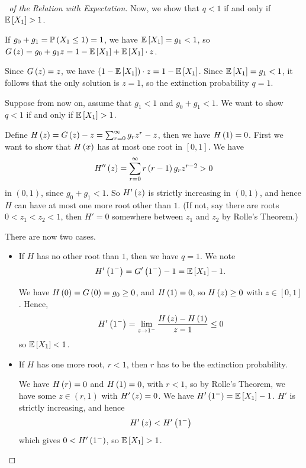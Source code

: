 \documentclass{article}
\theoremstyle{definition}
\theoremstyle{remark}
\newcommand{\Prob}{\mathbb{P}}
\newcommand{\Expt}{\mathbb{E}}
\newcommand{\ccintv}[2]{[#1,#2]}
\newcommand{\oointv}[2]{(#1,#2)}
\begin{document}
\begin{proof}[\proofname\ of the Relation with Expectation]
    Now, we show that \(q < 1\) if and only if \(\Expt\bqty{X_1} > 1\).

    If \(g_0 + g_1 = \Prob\pqty{X_1 \leq 1} = 1\), we have \(\Expt\bqty{X_1} = g_1 < 1\), so \(G\pqty{z} = g_0 + g_1 z = 1 - \Expt\bqty{X_1} + \Expt\bqty{X_1} \cdot z\).

    Since \(G\left(z\right) = z\), we have \(\pqty{1 - \Expt\bqty{X_1}} \cdot z = 1 - \Expt\bqty{X_1}\). Since \(\Expt\bqty{X_1} = g_1 < 1\), it follows that the only solution is \(z = 1\), so the extinction probability \(q = 1\).

    Suppose from now on, assume that \(g_1 < 1\) and \(g_0 + g_1 < 1\). We want to show \(q < 1\) if and only if \(\Expt\bqty{X_1} > 1\).

    Define \(H\left(z\right) = G\left(z\right) - z = \sum_{r = 0}^{\infty} g_r z^r - z\), then we have \(H\left(1\right) = 0\). First we want to show that \(H\left(x\right)\) has at most one root in \(\ccintv{0}{1}\). We have
    \[
        H''\left(z\right) = \sum_{r = 0}^{\infty} r \left(r - 1\right) g_r z^{r - 2} > 0
    \]
    in \(\oointv{0}{1}\), since \(g_0 + g_1 < 1\). So \(H'\left(z\right)\) is strictly increasing in \(\oointv{0}{1}\), and hence \(H\) can have at most one more root other than \(1\). (If not, say there are roots \(0 < z_1 < z_2 < 1\), then \(H' = 0\) somewhere between \(z_1\) and \(z_2\) by Rolle's Theorem.)

    There are now two cases.
    
    \begin{itemize}
        \item If \(H\) has no other root than \(1\), then we have \(q = 1\). We note
        \[
            H'\pqty{1^-} = G'\pqty{1^-} - 1 = \Expt\bqty{X_1} - 1.
        \]

        We have \(H\left(0\right) = G\left(0\right) = g_0 \geq 0\), and \(H\left(1\right) = 0\), so \(H\left(z\right) \geq 0\) with \(z \in \ccintv{0}{1}\). Hence,
        \[
            H'\left(1^-\right) = \lim_{z \to 1^-}  \frac{H\left(z\right) - H\left(1\right)}{z - 1} \leq 0
        \]
        so \(\Expt\bqty{X_1} < 1\).

        \item If \(H\) has one more root, \(r < 1\), then \(r\) has to be the extinction probability.
        
        We have \(H\left(r\right) = 0\) and \(H\left(1\right) = 0\), with \(r < 1\), so by Rolle's Theorem, we have some \(z \in \oointv{r}{1}\) with \(H'\left(z\right) = 0\). We have \(H'\pqty{1^-} = \Expt\bqty{X_1} - 1\). \(H'\) is strictly increasing, and hence
        \[
            H'\left(z\right) < H'\left(1^-\right)
        \]
        which gives \(0 < H'\left(1^-\right)\), so \(\Expt\bqty{X_1} > 1\).
    \end{itemize}
\end{proof}
\end{document}
